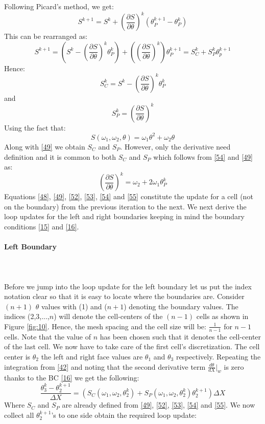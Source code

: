 \documentclass[12pt]{article}
\newcommand{\subsubsubsection}[1]{\paragraph{#1}\mbox{}\\}
\begin{document}
Following Picard's method, we get: 
\[
S^{k+1} = S^k + \left(\frac{\partial S}{\partial \theta}\right)^k (\theta_P^{k+1} - \theta_P^k) \tag{50} \label{50}
\]
This can be rearranged as: 
\[
S^{k+1} = \left(S^k-\left(\frac{\partial S}{\partial \theta}\right)^k \theta_P^k\right) + \left(\left(\frac{\partial S}{\partial \theta}\right)^k \right) \theta_P^{k+1} = S_C^k + S_P^k \theta_p^{k+1} \tag{51} \label{51} 
\]
Hence: 
\[
S_C^k = S^k-\left(\frac{\partial S}{\partial \theta}\right)^k \theta_P^k \tag{52} \label{52}
\]
and
\[
S_P^k = \left(\frac{\partial S}{\partial \theta}\right)^k \tag{53} \label{53}
\]
Using the fact that:
\[
S(\omega_1, \omega_2, \theta) = \omega_1 \theta^2 + \omega_2 \theta \tag{54} \label{54}
\]
Along with \eqref{49} we obtain $S_C$ and $S_P$. However, only the derivative need definition and it is common to both $S_C$ and $S_P$ which follows from \eqref{54} and \eqref{49} as:
\[
\left(\frac{\partial S}{\partial \theta}\right)^k = \omega_2 + 2 \omega_1 \theta_P^k \tag{55} \label{55}
\]
Equations \eqref{48}, \eqref{49}, \eqref{52}, \eqref{53}, \eqref{54} and \eqref{55} constitute the update for a cell (not on the boundary) from the previous iteration to the next. We next derive the loop updates for the left and right boundaries keeping in mind the boundary conditions \eqref{15} and \eqref{16}. 
\subsubsubsection{Left Boundary} 
\\
Before we jump into the loop update for the left boundary let us put the index notation clear so that it is easy to locate where the boundaries are. Consider $(n+1)$ $\theta$ values with (1) and ($n+1$) denoting the boundary values. The indices (2,3,...,$n$) will denote the cell-centers of the $(n-1)$ cells as shown in Figure \ref{fig:10}. Hence, the mesh spacing and the cell size will be: $\frac{1}{n-1}$ for $n-1$ cells. Note that the value of $n$ has been chosen such that it denotes the cell-center of the last cell. We now have to take care of the first cell's discretization. The cell center is $\theta_2$ the left and right face values are $\theta_1$ and $\theta_3$ respectively. Repeating the integration from \eqref{42} and noting that the second derivative term $\frac{d\theta}{dX}\Bigr|_w$ is zero thanks to the BC \eqref{16} we get the following: 
\[
\frac{\theta_3^k -\theta_2^{k+1}}{\Delta X} = (S_{C}(\omega_1, \omega_2, \theta_2^k) + S_{P}(\omega_1, \omega_2, \theta_2^k) \theta_2^{k+1} ) \Delta X \label{56} \tag{56}
\]
Where $S_C$ and $S_P$ are already defined from \eqref{49}, \eqref{52}, \eqref{53}, \eqref{54} and \eqref{55}. We now collect all $\theta_2^{k+1}$'s to one side obtain the required loop update:
\end{document}
